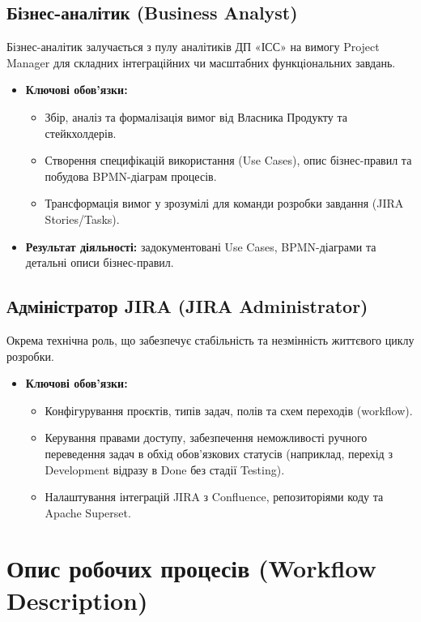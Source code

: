\documentclass{article}
\begin{document}
\subsection{Бізнес-аналітик (Business Analyst)}
Бізнес-аналітик залучається з пулу аналітиків ДП «ІСС» на вимогу Project Manager для складних інтеграційних чи масштабних функціональних завдань.
\begin{itemize}
    \item \textbf{Ключові обов'язки:}
    \begin{itemize}
        \item Збір, аналіз та формалізація вимог від Власника Продукту та стейкхолдерів.
        \item Створення специфікацій використання (Use Cases), опис бізнес-правил та побудова BPMN-діаграм процесів.
        \item Трансформація вимог у зрозумілі для команди розробки завдання (JIRA Stories/Tasks).
    \end{itemize}
    \item \textbf{Результат діяльності:} задокументовані Use Cases, BPMN-діаграми та детальні описи бізнес-правил.
\end{itemize}

\subsection{Адміністратор JIRA (JIRA Administrator)}
Окрема технічна роль, що забезпечує стабільність та незмінність життєвого циклу розробки.
\begin{itemize}
    \item \textbf{Ключові обов'язки:}
    \begin{itemize}
        \item Конфігурування проєктів, типів задач, полів та схем переходів (workflow).
        \item Керування правами доступу, забезпечення неможливості ручного переведення задач в обхід обов'язкових статусів (наприклад, перехід з Development відразу в Done без стадії Testing).
        \item Налаштування інтеграцій JIRA з Confluence, репозиторіями коду та Apache Superset.
    \end{itemize}
\end{itemize}

\section{Опис робочих процесів (Workflow Description)}
\end{document}
